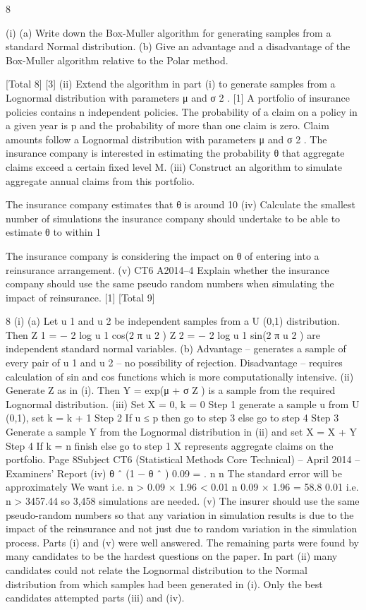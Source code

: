 \documentclass[a4paper,12pt]{article}
\begin{document}
8

(i) (a) Write down the Box-Muller algorithm for generating samples from a
standard Normal distribution.
(b) Give an advantage and a disadvantage of the Box-Muller algorithm
relative to the Polar method.

[Total 8]
[3]
(ii)
Extend the algorithm in part (i) to generate samples from a Lognormal
distribution with parameters μ and σ 2 .
[1]
A portfolio of insurance policies contains n independent policies. The probability of a
claim on a policy in a given year is p and the probability of more than one claim is
zero. Claim amounts follow a Lognormal distribution with parameters μ and σ 2 . The
insurance company is interested in estimating the probability θ that aggregate claims
exceed a certain fixed level M.
(iii)
Construct an algorithm to simulate aggregate annual claims from this
portfolio.

The insurance company estimates that θ is around 10%
(iv)
Calculate the smallest number of simulations the insurance company should
undertake to be able to estimate θ to within 1%

The insurance company is considering the impact on θ of entering into a reinsurance
arrangement.
(v)
CT6 A2014–4
Explain whether the insurance company should use the same pseudo random
numbers when simulating the impact of reinsurance.
[1]
[Total 9]
\newpage


8
(i)
(a)
Let u 1 and u 2 be independent samples from a U (0,1) distribution.
Then Z 1 = − 2 log u 1 cos(2 π u 2 )
Z 2 = − 2 log u 1 sin(2 π u 2 )
are independent standard normal variables.
(b)
Advantage –
generates a sample of every pair of u 1 and u 2 – no
possibility of rejection.
Disadvantage – requires calculation of sin and cos functions which is
more computationally intensive.
(ii)
Generate Z as in (i). Then
Y = exp(μ + σ Z )
is a sample from the required Lognormal distribution.
(iii)
Set
X = 0, k = 0
Step 1 generate a sample u from U (0,1), set k = k + 1
Step 2 If u ≤ p then go to step 3 else go to step 4
Step 3 Generate a sample Y from the Lognormal distribution in (ii) and set
X = X + Y
Step 4 If k = n finish else go to step 1
X represents aggregate claims on the portfolio.
Page 8Subject CT6 (Statistical Methods Core Technical) – April 2014 – Examiners’ Report
(iv)
θ ˆ (1 − θ ˆ )
0.09
=
.
n
n
The standard error will be approximately
We want
i.e.
n >
0.09
× 1.96 < 0.01
n
0.09 × 1.96
= 58.8
0.01
i.e. n > 3457.44
so 3,458 simulations are needed.
(v)
The insurer should use the same pseudo-random numbers so that any variation
in simulation results is due to the impact of the reinsurance and not just due to
random variation in the simulation process.
Parts (i) and (v) were well answered. The remaining parts were found by many candidates to
be the hardest questions on the paper. In part (ii) many candidates could not relate the
Lognormal distribution to the Normal distribution from which samples had been generated in
(i). Only the best candidates attempted parts (iii) and (iv).
\end{document}
